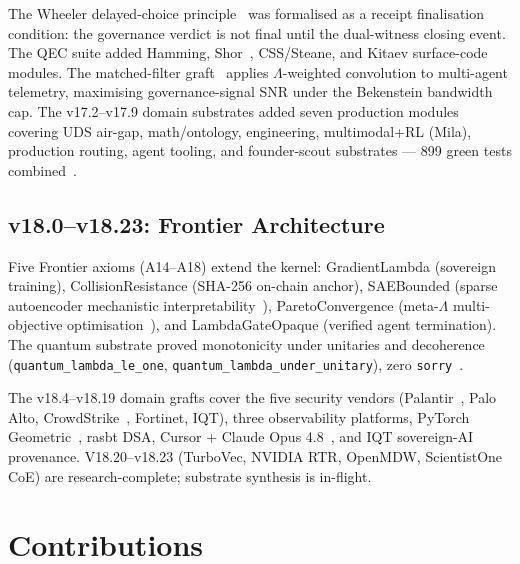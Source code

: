 The Wheeler delayed-choice principle~\cite{wheeler1978past} was formalised
as a receipt finalisation condition: the governance verdict is not final
until the dual-witness closing event.
The QEC suite added Hamming, Shor~\cite{shor1995scheme},
CSS/Steane, and Kitaev surface-code~\cite{kitaev2003fault} modules.
The matched-filter graft~\cite{north1943analysis} applies
\(\Lambda\)-weighted convolution to multi-agent telemetry, maximising
governance-signal SNR under the Bekenstein bandwidth cap.
The v17.2--v17.9 domain substrates added seven production modules covering
UDS air-gap, math/ontology, engineering, multimodal+RL (Mila), production
routing, agent tooling, and founder-scout substrates --- 899 green tests
combined~\cite{lutar2026v17}.

\subsection{v18.0--v18.23: Frontier Architecture}

Five Frontier axioms (A14--A18) extend the kernel: GradientLambda
(sovereign training), CollisionResistance (SHA-256 on-chain anchor),
SAEBounded (sparse autoencoder mechanistic interpretability~\cite{elhage2022toy}),
ParetoConvergence (meta-\(\Lambda\) multi-objective
optimisation~\cite{miettinen1999nonlinear}), and LambdaGateOpaque
(verified agent termination).
The quantum substrate proved monotonicity under unitaries and decoherence
(\texttt{quantum\_lambda\_le\_one}, \texttt{quantum\_lambda\_under\_unitary}),
zero \texttt{sorry}~\cite{nvidia2023cuquantum,jones2019quest}.

\medskip

The v18.4--v18.19 domain grafts cover the five security vendors
(Palantir~\cite{palantir2022foundry}, Palo Alto, CrowdStrike~\cite{crowdstrike2024incident},
Fortinet, IQT), three observability platforms, PyTorch
Geometric~\cite{fey2019fast,scarselli2009graph}, rasbt DSA,
Cursor + Claude Opus 4.8~\cite{anthropic2024mcp,anthropic2024claude},
and IQT sovereign-AI provenance.
V18.20--v18.23 (TurboVec, NVIDIA RTR, OpenMDW, ScientistOne CoE) are
research-complete; substrate synthesis is in-flight.


\section{Contributions}
\label{sec:contributions}

